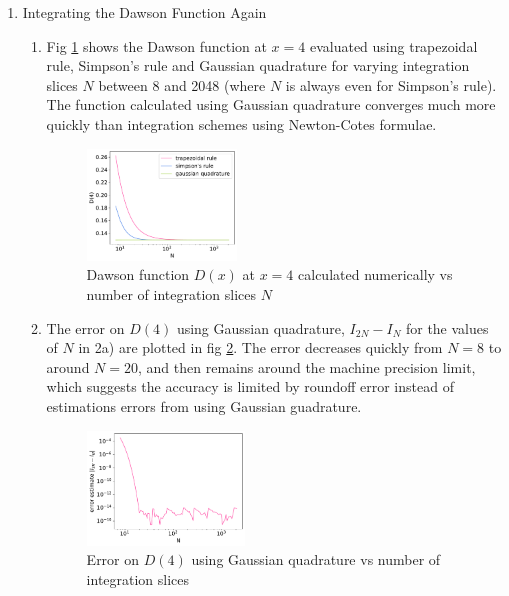 \documentclass{article}
\begin{document}
\begin{enumerate}
\item Integrating the Dawson Function Again
\begin{enumerate}
  \item Fig \ref{fig:2a} shows the Dawson function at $x=4$ evaluated using trapezoidal rule, Simpson's rule and Gaussian quadrature for varying integration slices $N$ between 8 and 2048 (where $N$ is always even for Simpson's rule). 
  The function calculated using Gaussian quadrature converges much more quickly than integration schemes using Newton-Cotes formulae.
  \begin{figure}[h]
    \centering 
    \includegraphics[width=0.4\textwidth]{Q2a.pdf}
    \caption{Dawson function $D(x)$ at $x=4$ calculated numerically vs number of integration slices $N$}
    \label{fig:2a}
  \end{figure}
  \item The error on $D(4)$ using Gaussian quadrature, $I_{2N} - I_N$ for the values of $N$ in 2a) are plotted in fig \ref{fig:2b}. The error decreases quickly from $N=8$ to around $N=20$, and then remains around the machine precision limit, 
  which suggests the accuracy is limited by roundoff error instead of estimations errors from using Gaussian guadrature.
  \begin{figure}[h]
    \centering 
    \includegraphics[width=0.42\textwidth]{Q2b.pdf}
    \caption{Error on $D(4)$ using Gaussian quadrature vs number of integration slices}
    \label{fig:2b}
  \end{figure}



\end{enumerate}
\end{enumerate}
\end{document}
